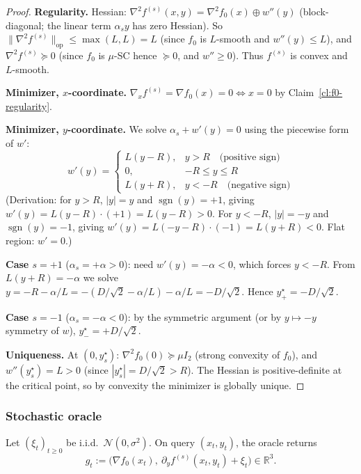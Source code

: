 \documentclass[11pt]{article}
\theoremstyle{definition}
\theoremstyle{remark}
\DeclareMathOperator{\sgn}{sgn}
\begin{document}
\begin{proof}
\textbf{Regularity.} Hessian: $\nabla^2 f^{(s)}(x,y) = \nabla^2 f_0(x) \oplus w''(y)$ (block-diagonal; the linear term $\alpha_s y$ has zero Hessian). So $\|\nabla^2 f^{(s)}\|_{\mathrm{op}} \leq \max(L, L) = L$ (since $f_0$ is $L$-smooth and $w''(y) \leq L$), and $\nabla^2 f^{(s)} \succeq 0$ (since $f_0$ is $\mu$-SC hence $\succeq 0$, and $w'' \geq 0$). Thus $f^{(s)}$ is convex and $L$-smooth.

\textbf{Minimizer, $x$-coordinate.} $\nabla_x f^{(s)} = \nabla f_0(x) = 0 \iff x = 0$ by Claim~\ref{cl:f0-regularity}.

\textbf{Minimizer, $y$-coordinate.} We solve $\alpha_s + w'(y) = 0$ using the piecewise form of $w'$:
\[
  w'(y) = \begin{cases}L(y - R), & y > R \quad \text{(positive sign)} \\ 0, & -R \leq y \leq R \\ L(y + R), & y < -R \quad \text{(negative sign)}\end{cases}
\]
(Derivation: for $y > R$, $|y| = y$ and $\sgn(y) = +1$, giving $w'(y) = L(y-R)\cdot(+1) = L(y-R) > 0$. For $y < -R$, $|y| = -y$ and $\sgn(y) = -1$, giving $w'(y) = L(-y-R)\cdot(-1) = L(y+R) < 0$. Flat region: $w' = 0$.)

\textbf{Case $s = +1$} ($\alpha_s = +\alpha > 0$): need $w'(y) = -\alpha < 0$, which forces $y < -R$. From $L(y + R) = -\alpha$ we solve $y = -R - \alpha/L = -(D/\sqrt 2 - \alpha/L) - \alpha/L = -D/\sqrt 2$. Hence $y^\star_{+} = -D/\sqrt 2$.

\textbf{Case $s = -1$} ($\alpha_s = -\alpha < 0$): by the symmetric argument (or by $y \mapsto -y$ symmetry of $w$), $y^\star_{-} = +D/\sqrt 2$.

\textbf{Uniqueness.} At $(0, y^\star_s)$: $\nabla^2 f_0(0) \succeq \mu I_2$ (strong convexity of $f_0$), and $w''(y^\star_s) = L > 0$ (since $|y^\star_s| = D/\sqrt 2 > R$). The Hessian is positive-definite at the critical point, so by convexity the minimizer is globally unique.
\end{proof}

\subsubsection{Stochastic oracle}
\label{sec:oracle}

Let $(\xi_t)_{t\geq 0}$ be i.i.d.\ $\mathcal{N}(0, \sigma^2)$. On query $(x_t, y_t)$, the oracle returns
\begin{equation}
  g_t := \big(\nabla f_0(x_t),\ \partial_y f^{(s)}(x_t, y_t) + \xi_t\big) \in \mathbb{R}^3.\tag{ORACLE}
\end{equation}
\end{document}
